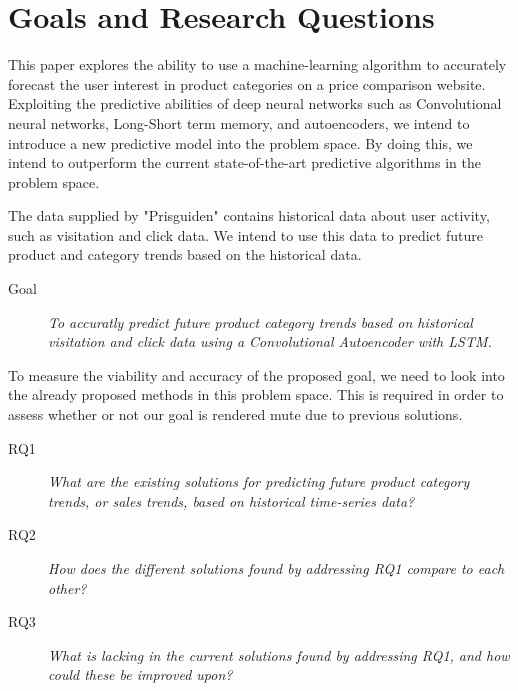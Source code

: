 \section{Goals and Research Questions}
\label{section:Introduction:Goal}

This paper explores the ability to use a machine-learning algorithm to accurately forecast the user interest in product categories on a price comparison website.
Exploiting the predictive abilities of deep neural networks such as Convolutional neural networks, Long-Short term memory, and autoencoders,
we intend to introduce a new predictive model into the problem space.
By doing this, we intend to outperform the current state-of-the-art predictive algorithms in the problem space.

The data supplied by "Prisguiden" contains historical data about user activity, such as visitation and click data.
We intend to use this data to predict future product and category trends based on the historical data.

\begin{description}
    \item[Goal]{\it To accuratly predict future product category trends based on historical visitation and click data using a Convolutional Autoencoder with LSTM.}
\end{description}

To measure the viability and accuracy of the proposed goal, we need to look into the already proposed methods in this problem space.
This is required in order to assess whether or not our goal is rendered mute due to previous solutions.


\begin{description}
    \item[RQ1]{\it What are the existing solutions for predicting future product category trends, or sales trends, based on historical time-series data?}
\end{description}

\begin{description}
    \item[RQ2]{\it How does the different solutions found by addressing RQ1 compare to each other?}
\end{description}

\begin{description}
    \item[RQ3]{\it What is lacking in the current solutions found by addressing RQ1, and how could these be improved upon?}
\end{description}


